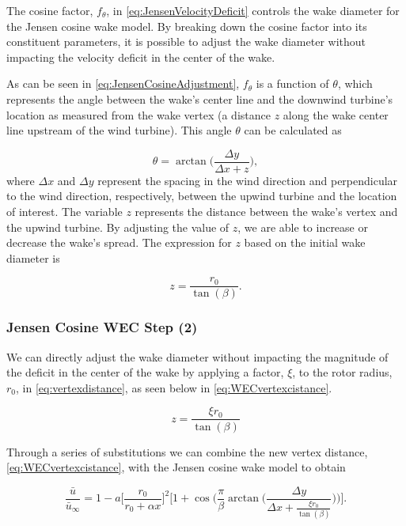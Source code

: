 \documentclass{jpconf}
\begin{document}
The cosine factor, $f_\theta$, in \cref{eq:JensenVelocityDeficit} controls the wake diameter for the Jensen cosine wake model. By breaking down the cosine factor into its constituent parameters, it is possible to adjust the wake diameter without impacting the velocity deficit in the center of the wake.

As can be seen in \cref{eq:JensenCosineAdjustment}, $f_\theta$ is a function of $\theta$, which represents the angle between the wake's center line and the downwind turbine's location as measured from the wake vertex (a distance $z$ along the wake center line upstream of the wind turbine). This angle $\theta$ can be calculated as

\begin{equation}
	\theta = \arctan\Big( \frac{\Delta y}{\Delta x + z} \Big),
	\label{eq:Theta}
\end{equation}
%
where $\Delta x$ and $\Delta y$ represent the spacing in the wind direction and perpendicular to the wind direction, respectively, between the upwind turbine and the location of interest. The variable $z$ represents the distance between the wake's vertex and the upwind turbine. By adjusting the value of $z$, we are able to increase or decrease the wake's spread. The expression for $z$ based on the initial wake diameter is

\begin{equation}
	z = \frac{r_0}{\tan(\beta)}.
	\label{eq:vertexdistance}
\end{equation} 


\subsubsection{Jensen Cosine WEC Step (2)}
We can directly adjust the wake diameter without impacting the magnitude of the deficit in the center of the wake by applying a factor, $\xi$, to the rotor radius, $r_0$, in \cref{eq:vertexdistance}, as seen below in \cref{eq:WECvertexcistance}.

\begin{equation}
	z = \frac{\xi r_0}{\tan(\beta)}
	\label{eq:WECvertexcistance}
\end{equation}

Through a series of substitutions we can combine the new vertex distance, \cref{eq:WECvertexcistance}, with the Jensen cosine wake model to obtain

\begin{equation}
	\frac{\bar{u}}{\bar{u}_\infty} = 1 - a \bigg[\frac{r_0}{r_0 + \alpha x} \bigg]^2 \Bigg[1 + \cos{\Bigg(\frac{\pi}{\beta} \arctan{\Bigg(\frac{\Delta y}{\Delta x + \frac{\xi r_0}{\tan(\beta)}}} \Bigg) \Bigg)} \Bigg].
	\label{eq:JensenVelocityDeficitCombined}
\end{equation}
\end{document}
